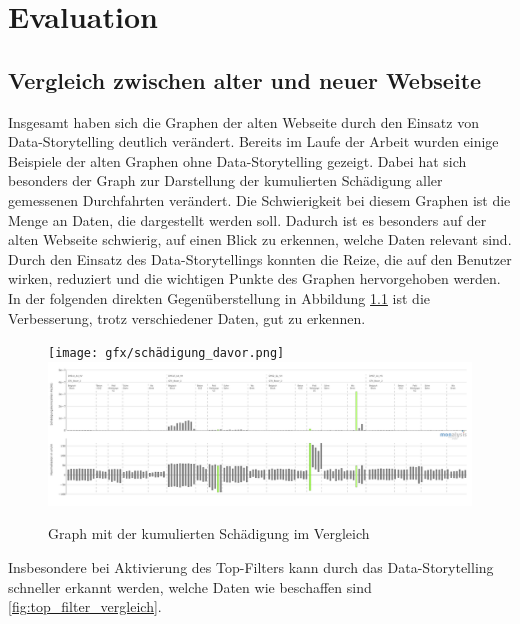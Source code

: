 \chapter{Evaluation}
\section{Vergleich zwischen alter und neuer Webseite}
Insgesamt haben sich die Graphen der alten Webseite durch den Einsatz von Data-Storytelling deutlich verändert. Bereits im Laufe der Arbeit wurden einige Beispiele der alten Graphen ohne Data-Storytelling gezeigt. Dabei hat sich besonders der Graph zur Darstellung der kumulierten Schädigung aller gemessenen Durchfahrten verändert. Die Schwierigkeit bei diesem Graphen ist die Menge an Daten, die dargestellt werden soll. Dadurch ist es besonders auf der alten Webseite schwierig, auf einen Blick zu erkennen, welche Daten  relevant sind. Durch den Einsatz des Data-Storytellings konnten die Reize, die auf den Benutzer wirken, reduziert und die wichtigen Punkte des Graphen hervorgehoben werden. In der folgenden direkten Gegenüberstellung in Abbildung \ref{fig:schädigung_vergleich} ist die Verbesserung, trotz verschiedener Daten, gut zu erkennen.\\
\begin{figure}[!h]
    \centering
    \texttt{[image: gfx/schädigung\_davor.png]}
    \includegraphics[width=1\linewidth]{gfx/new_schaedigung.png}
    \caption{Graph mit der kumulierten Schädigung im Vergleich}
    \label{fig:schädigung_vergleich}
\end{figure}
\noindent
Insbesondere bei Aktivierung des Top-Filters kann durch das Data-Storytelling schneller erkannt werden, welche Daten wie beschaffen sind \ref{fig:top_filter_vergleich}. 
